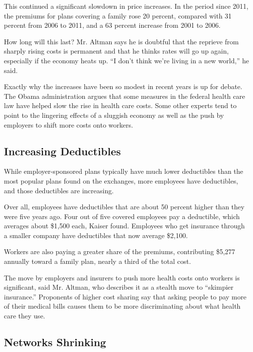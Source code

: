 This continued a significant slowdown in price increases. In the period
since 2011, the premiums for plans covering a family rose 20 percent,
compared with 31 percent from 2006 to 2011, and a 63 percent increase
from 2001 to 2006.

How long will this last? Mr. Altman says he is doubtful that the
reprieve from sharply rising costs is permanent and that he thinks rates
will go up again, especially if the economy heats up. ``I don't think
we're living in a new world,'' he said.

Exactly why the increases have been so modest in recent years is up for
debate. The Obama administration argues that some measures in the
federal health care law have helped slow the rise in health care costs.
Some other experts tend to point to the lingering effects of a sluggish
economy as well as the push by employers to shift more costs onto
workers.

\hypertarget{increasing-deductibles}{%
\subsection{Increasing Deductibles}\label{increasing-deductibles}}

While employer-sponsored plans typically have much lower deductibles
than the most popular plans found on the exchanges, more employees have
deductibles, and those deductibles are increasing.

Over all, employees have deductibles that are about 50 percent higher
than they were five years ago. Four out of five covered employees pay a
deductible, which averages about \$1,500 each, Kaiser found. Employees
who get insurance through a smaller company have deductibles that now
average \$2,100.

Workers are also paying a greater share of the premiums, contributing
\$5,277 annually toward a family plan, nearly a third of the total cost.

The move by employers and insurers to push more health costs onto
workers is significant, said Mr. Altman, who describes it as a stealth
move to ``skimpier insurance.'' Proponents of higher cost sharing say
that asking people to pay more of their medical bills causes them to be
more discriminating about what health care they use.

\hypertarget{networks-shrinking}{%
\subsection{Networks Shrinking}\label{networks-shrinking}}

